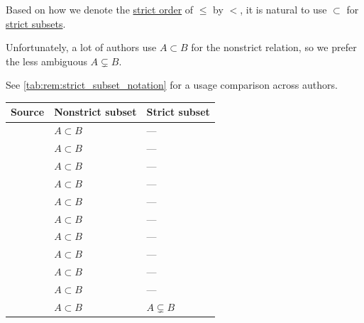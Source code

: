 \begin{remark}\label{rem:strict_subset_notation}
  Based on how we denote the \hyperref[def:partially_ordered_set/strict]{strict order} of \( {\leq} \) by \( {<} \), it is natural to use \( {\subset} \) for \hyperref[def:subset]{strict subsets}.

  Unfortunately, a lot of authors use \( A \subset B \) for the nonstrict relation, so we prefer the less ambiguous \( A \subsetneq B \).

  See \cref{tab:rem:strict_subset_notation} for a usage comparison across authors.

  \begin{table}
    \centering
    \begin{tabular}{l l l}
      \toprule
      Source                                                          & Nonstrict subset    & Strict subset        \\
      \midrule
      \cite[9]{Jech2006SetTheory}                                     & \( A \subset B \)   & ---                  \\
      \cite[def. 1.3]{Rudin1976AnalysisPrinciples}                    & \( A \subset B \)   & ---                  \\
      \cite[1]{Engelking1989GeneralTopology}                          & \( A \subset B \)   & ---                  \\
      \cite[2]{Kelley1975GeneralTopology}                             & \( A \subset B \)   & ---                  \\
      \cite[91]{Halmos1960NaiveSetTheory}                             & \( A \subset B \)   & ---                  \\
      \cite[1]{Willard2004GeneralTopology}                            & \( A \subset B \)   & ---                  \\
      \cite[7]{Зорич2019АнализЧасть1}                                 & \( A \subset B \)   & ---                  \\
      \cite[59]{ИльинСадовничийСендов1985АнализТом1}                  & \( A \subset B \)   & ---                  \\
      \cite[15]{КусраевКутателадзе2005БулевозначныйАнализ}            & \( A \subset B \)   & ---                  \\
      \cite[144]{Тагамлицки1978ИнтегралноСмятане}                     & \( A \subset B \)   & ---                  \\
      \cite[3]{Jacobson1985BasicAlgebraI}                             & \( A \subset B \)   & \( A \subsetneq B \) \\

\end{tabular}
\end{table}
\end{remark}
